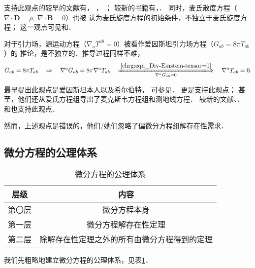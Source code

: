 支持此观点的较早的文献有\textcite[\S 30]{landau_2-classical-fields}，
\textcite[\S 18.1-18.3]{feynman-2006-v2}，
\textcite[\S 24]{pauli-1973-ED}；
较新的书籍有\textcite[p.3]{jackson1998}，\textcite[\S 8.1]{griffiths-2023}．
同时，麦氏散度方程（$\nabla\cdot \boldsymbol{D}=\rho,\ \nabla \cdot \boldsymbol{B}=0$）也被
认为麦氏旋度方程的初始条件，不独立于麦氏旋度方程；
这一观点可见\textcite[p.6]{stratton1941}和\textcite[p.603]{courant_hilbert-v2}．




对于引力场，源运动方程（$\nabla_a T^{ab}=0$）被看作爱因斯坦引力场方程（$G_{ab}=8\pi T_{ab}$）的
推论，是不独立的．推导过程同样不难，
\begin{equation}
    G_{ab}=8\pi T_{ab} \quad \Rightarrow \quad
    \nabla^a G_{ab}=8\pi \nabla^a T_{ab}
    \quad \xLongrightarrow[\nabla^a G_{ab}=0]{\ref{chrg:eqn_Div-Einstein-tensor=0}} \quad
    \nabla^a T_{ab}=0 .
\end{equation}

最早提出此观点是爱因斯坦\cite{einstein_infeld_1949}本人以及希尔伯特，
可参见\parencite[\S 15(c)]{Pais-1982}．
\textcite[\S 17.1-17.2]{mtw1973}更是支持此观点；
甚至，他们\cite[\S 20.6]{mtw1973}还从爱氏方程组导出了麦克斯韦方程组和测地线方程．
较新的文献\textcite[\S 6.6]{schutz-2022}、\textcite[\S 5.4]{poisson-will-2014}、
\textcite[\S 9.3]{witten-2024}和\textcite[p.44]{Choquet-Bruhat-2009}也支持此观点．

然而，上述观点是错误的\cite{liu2018}，他们/她们忽略了偏微分方程组解存在性需求．

\subsection{微分方程的公理体系}


\begin{table}[htb]
    \centering
    \caption{微分方程的公理体系} \label{chfd:tab-diff-axiom}
    \begin{tabular}{|*2{c|}}
        \hline
        层级 & 内容 \\ \hline
        第〇层 & 微分方程本身   \\ \hline
        第一层 & 微分方程解存在性定理 \\ \hline
        第二层 & 除解存在性定理之外的所有由微分方程得到的定理  \\ \hline
    \end{tabular}
\end{table}

我们先粗略地建立微分方程的公理体系，见表\ref{chfd:tab-diff-axiom}．

